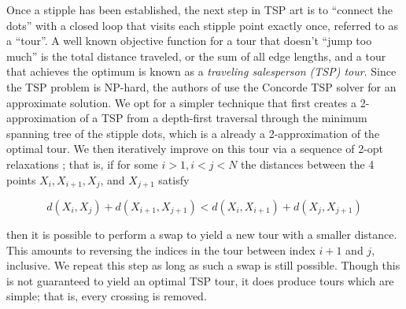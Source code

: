 \documentclass[runningheads]{llncs}
\begin{document}
Once a stipple has been established, the next step in TSP art is to ``connect the dots'' with a closed loop that visits each stipple point exactly once, referred to as a ``tour''.  A well known objective function for a tour that doesn't ``jump too much'' is the total distance traveled, or the sum of all edge lengths, and a tour that achieves the optimum is known as a {\em traveling salesperson (TSP) tour}.  Since the TSP problem is NP-hard, the authors of  \cite{kaplan2005tsp} use the Concorde TSP solver \cite{applegate2001concorde} for an approximate solution. We opt for a simpler technique that first creates a 2-approximation of a TSP from a depth-first traversal through the minimum spanning tree of the stipple dots, which is a already a 2-approximation of the optimal tour.  We then iteratively improve on this tour via a sequence of 2-opt relaxations \cite{johnson1997traveling}; that is, if for some $i > 1, i < j < N$ the distances between the 4 points $X_i, X_{i+1}, X_j$, and $X_{j+1}$ satisfy


  

\begin{equation}
  d(X_i, X_j) + d(X_{i+1}, X_{j+1}) < d(X_i, X_{i+1}) + d(X_j, X_{j+1})
\end{equation}

then it is possible to perform a swap to yield a new tour with a smaller distance.  This amounts to reversing the indices in the tour between index $i+1$ and $j$, inclusive.  We repeat this step as long as such a swap is still possible.  Though this is not guaranteed to yield an optimal TSP tour, it does produce tours which are simple; that is, every crossing is removed.%
\end{document}
